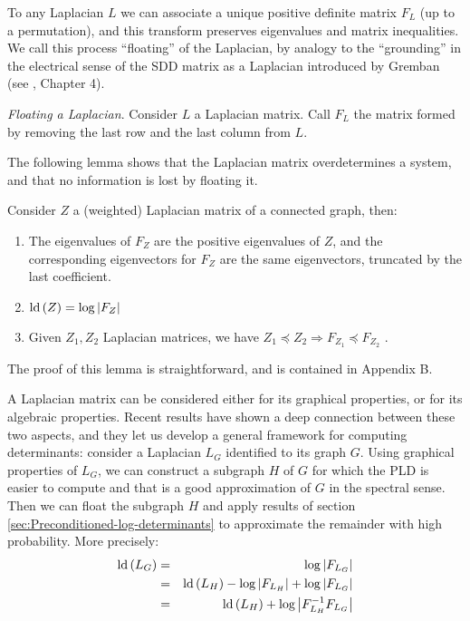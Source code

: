 To any Laplacian $L$ we can associate a unique positive definite
matrix $F_{L}$ (up to a permutation), and this transform preserves
eigenvalues and matrix inequalities. We call this process ``floating''
of the Laplacian, by analogy to the ``grounding'' in the electrical
sense of the SDD matrix as a Laplacian introduced by Gremban (see
\cite{Gremban1996}, Chapter 4).

\begin{definition}\emph{Floating a Laplacian}. Consider $L$ a Laplacian
matrix. Call $F_{L}$ the matrix formed by removing the last row and
the last column from $L$.

\end{definition}

The following lemma shows that the Laplacian matrix overdetermines
a system, and that no information is lost by floating it.

\begin{lemma}\label{lem:floating-properties}Consider $Z$ a (weighted)
Laplacian matrix of a connected graph, then: 
\begin{enumerate}
\item The eigenvalues of $F_{Z}$ are the positive eigenvalues of $Z$,
and the corresponding eigenvectors for $F_{Z}$ are the same eigenvectors,
truncated by the last coefficient. 
\item $\text{\textnormal{ld}}\left(Z\right)=\log\left|F_{Z}\right|$ 
\item Given $Z_{1},Z_{2}$ Laplacian matrices, we have $Z_{1}\preceq Z_{2}\Rightarrow F_{Z_{1}}\preceq F_{Z_{2}}$
.
\end{enumerate}
\end{lemma}

The proof of this lemma is straightforward, and is contained in Appendix
B.

A Laplacian matrix can be considered either for its graphical properties,
or for its algebraic properties. Recent results have shown a deep
connection between these two aspects, and they let us develop a general
framework for computing determinants: consider a Laplacian $L_{G}$
identified to its graph $G$. Using graphical properties of $L_{G}$,
we can construct a subgraph $H$ of $G$ for which the PLD is easier
to compute and that is a good approximation of $G$ in the spectral
sense. Then we can float the subgraph $H$ and apply results of section
\ref{sec:Preconditioned-log-determinants} to approximate the remainder
with high probability. More precisely:
\begin{eqnarray*}
\text{\textnormal{ld}}\left(L_{G}\right) & = & \log\left|F_{L_{G}}\right|\\
 & = & \text{\textnormal{ld}}\left(L_{H}\right)-\log\left|F_{L_{H}}\right|+\log\left|F_{L_{G}}\right|\\
 & = & \text{\textnormal{ld}}\left(L_{H}\right)+\log\left|F_{L_{H}}^{-1}F_{L_{G}}\right|
\end{eqnarray*}



